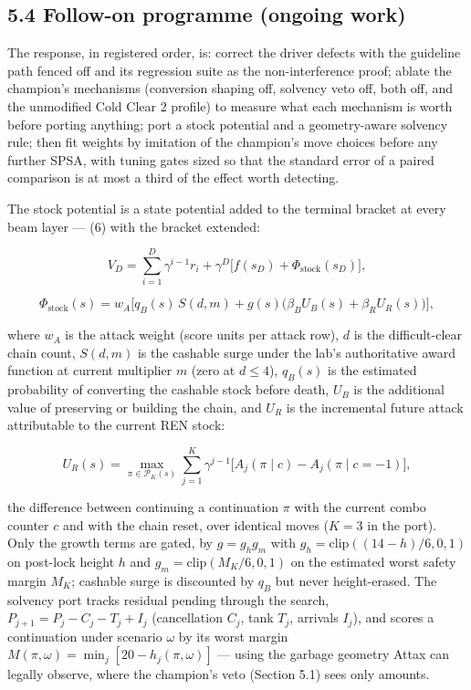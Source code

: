 \documentclass[
  11pt,
]{article}
\begin{document}
\subsection{5.4 Follow-on programme (ongoing
work)}\label{follow-on-programme-ongoing-work}

The response, in registered order, is: correct the driver defects with
the guideline path fenced off and its regression suite as the
non-interference proof; ablate the champion's mechanisms (conversion
shaping off, solvency veto off, both off, and the unmodified Cold Clear
2 profile) to measure what each mechanism is worth before porting
anything; port a stock potential and a geometry-aware solvency rule;
then fit weights by imitation of the champion's move choices before any
further SPSA, with tuning gates sized so that the standard error of a
paired comparison is at most a third of the effect worth detecting.

The stock potential is a state potential added to the terminal bracket
at every beam layer --- (6) with the bracket extended:

\begin{equation}V_D = \sum_{i=1}^{D} \gamma^{i-1} r_i + \gamma^D \big[ f(s_D) + \Phi_{\mathrm{stock}}(s_D) \big],
\end{equation}

\begin{equation}\Phi_{\mathrm{stock}}(s) = w_A \Big[ q_B(s) \, S(d, m) + g(s) \big( \beta_B U_B(s) + \beta_R U_R(s) \big) \Big],
\end{equation}

where \(w_A\) is the attack weight (score units per attack row), \(d\)
is the difficult-clear chain count, \(S(d, m)\) is the cashable surge
under the lab's authoritative award function at current multiplier \(m\)
(zero at \(d
\le 4\)), \(q_B(s)\) is the estimated probability of converting the
cashable stock before death, \(U_B\) is the additional value of
preserving or building the chain, and \(U_R\) is the incremental future
attack attributable to the current REN stock:

\begin{equation}U_R(s) = \max_{\pi \in \mathcal{P}_K(s)} \sum_{j=1}^{K} \gamma^{j-1} \Big[ A_j(\pi \mid c) - A_j(\pi \mid c = -1) \Big],
\end{equation}

the difference between continuing a continuation \(\pi\) with the
current combo counter \(c\) and with the chain reset, over identical
moves (\(K = 3\) in the port). Only the growth terms are gated, by
\(g = g_h g_m\) with \(g_h
= \mathrm{clip}((14 - h)/6, 0, 1)\) on post-lock height \(h\) and
\(g_m =
\mathrm{clip}(M_K/6, 0, 1)\) on the estimated worst safety margin
\(M_K\); cashable surge is discounted by \(q_B\) but never
height-erased. The solvency port tracks residual pending through the
search, \(P_{j+1} = P_j -
C_j - T_j + I_j\) (cancellation \(C_j\), tank \(T_j\), arrivals
\(I_j\)), and scores a continuation under scenario \(\omega\) by its
worst margin \(M(\pi, \omega) = \min_j [20 - h_j(\pi, \omega)]\) ---
using the garbage geometry Attax can legally observe, where the
champion's veto (Section 5.1) sees only amounts.
\end{document}
